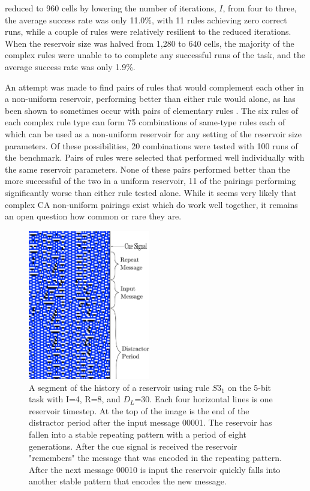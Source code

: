 \documentclass{elsarticle}
\begin{document}
\begin{multicols}{2}
reduced to 960 cells by lowering the number of iterations, $I$, from four to 
three, the average success rate was only 11.0\%, with 11 rules achieving zero 
correct runs, while a  couple of rules were  relatively resilient to the 
reduced iterations. When the reservoir size was halved from 1,280 to 640  
cells, the majority of the complex rules were unable to to complete any 
successful runs of the task, and the average success rate was only 1.9\%. \par 
An attempt was made to find pairs of rules that would complement each other in 
a non-uniform reservoir, performing better than either rule would alone, as has 
been shown to sometimes occur with pairs of elementary rules 
\cite{nichele2017reservoir}. The six rules of each complex rule type can form 
75 combinations of same-type rules each of which can be used as a non-uniform 
reservoir for  any setting of the reservoir size parameters. Of these 
possibilities, 20 combinations were tested with 100 runs of the benchmark.  
Pairs of rules were selected that performed well individually with the same 
reservoir parameters.  None of these pairs performed better than the more 
successful of the two in a uniform reservoir, 11 of the pairings performing 
significantly worse than either rule tested alone. While it seems very likely 
that complex CA non-uniform pairings exist which do work well together, it 
remains an open question how common or rare they are.
 

\begin{figure}[H]
\centering
\includegraphics[width=0.475\textwidth]{RepeatMessage.pdf}
\caption{A segment of the history of a reservoir using rule $S3_{1}$ on the 
   5-bit task with I=4, R=8, and $D_{L}$=30. Each four horizontal lines is one 
      reservoir timestep. At the top of the image is the end of the distractor 
      period after the input message 00001. The reservoir has fallen into a 
      stable repeating pattern with a period of eight generations. After the 
      cue signal is received the reservoir "remembers" the message that was 
      encoded in the repeating pattern. After the next message 00010 is input 
      the reservoir quickly falls into another stable pattern that encodes the 
      new message.} 
        

\end{figure}
\end{multicols}
\end{document}

